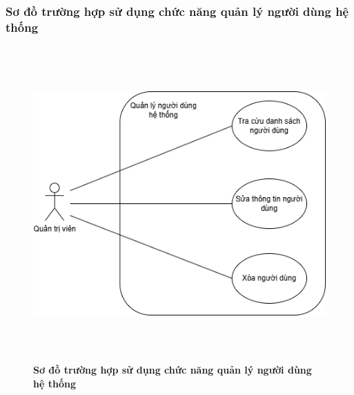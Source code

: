 \subsubsection{Sơ đồ trường hợp sử dụng chức năng quản lý người dùng hệ thống}

\begin{figure}[H]
	\centering
	\includegraphics[width=12cm,height=12cm]{Images/use_case/use_case_user.png}
	\caption[Sơ đồ trường hợp sử dụng chức năng quản lý người dùng]{\bfseries \fontsize{12pt}{0pt}
		\selectfont Sơ đồ trường hợp sử dụng chức năng quản lý người dùng hệ thống}
	\label{use_case_user} %
\end{figure}

